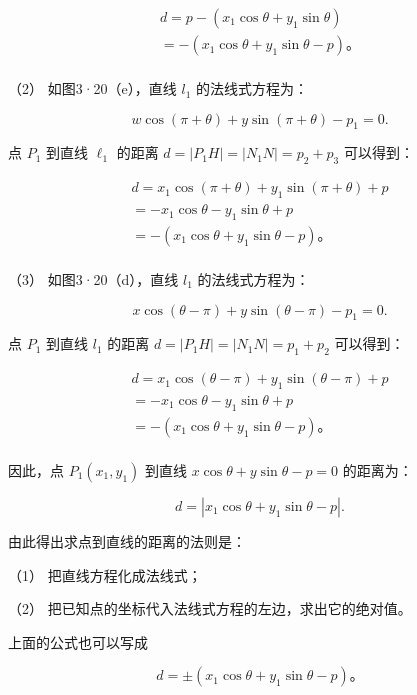 \[
\begin{array}{l} d = p - \left(x_{1} \cos \theta + y_{1} \sin \theta\right) \\ = - \left(x_{1} \cos \theta + y_{1} \sin \theta - p\right)\text{。} \\ \end{array}
\]

（2） 如图3·20（e），直线 \(l_{1}\) 的法线式方程为：

\[
w \cos (\pi + \theta) + y \sin (\pi + \theta) - p_{1} = 0.
\]

点 \(P_{1}\) 到直线 \(\ell_{1}\) 的距离
\(d = |P_{1}H| = |N_{1}N| = p_{2} + p_{3}\) 可以得到：

\[
\begin{array}{l} d = x_{1} \cos (\pi + \theta) + y_{1} \sin (\pi + \theta) + p \\ = - x_{1} \cos \theta - y_{1} \sin \theta + p \\ = - \left(x_{1} \cos \theta + y_{1} \sin \theta - p\right)\text{。} \\ \end{array}
\]

（3） 如图3·20（d），直线 \(l_{1}\) 的法线式方程为：

\[
x \cos (\theta - \pi) + y \sin (\theta - \pi) - p_{1} = 0.
\]

点 \(P_{1}\) 到直线 \(l_{1}\) 的距离
\(d = |P_{1}H| = |N_{1}N| = p_{1} + p_{2}\) 可以得到：

\[
\begin{array}{l} d = x_{1} \cos (\theta - \pi) + y_{1} \sin (\theta - \pi) + p \\ = - x_{1} \cos \theta - y_{1} \sin \theta + p \\ = - \left(x_{1} \cos \theta + y_{1} \sin \theta - p\right)\text{。} \\ \end{array}
\]

因此，点 \(P_{1}(x_{1},y_{1})\) 到直线
\(x\cos \theta + y\sin \theta -p = 0\) 的距离为：

\[
\boxed {d = \left| x_{1} \cos \theta + y_{1} \sin \theta - p \right|.}
\]

由此得出求点到直线的距离的法则是：

（1） 把直线方程化成法线式；

（2） 把已知点的坐标代入法线式方程的左边，求出它的绝对值。

上面的公式也可以写成

\[
d = \pm (x_{1} \cos \theta + y_{1} \sin \theta - p)\text{。}
\]

